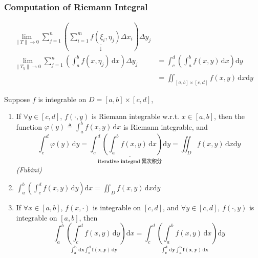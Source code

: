 \subsubsection[二重积分的计算]{Computation of Riemann Integral}

\begin{align*}
    \lim_{\|T\|\to 0}\sum_{j=1}^n\left(\underset{\downarrow}{\underline{\sum_{i=1}^mf(\xi_i,\eta_j)\Delta x_i}}\right)\Delta y_j
     &                                                               \\
    \lim_{\|T_y\|\to 0}\sum_{j=1}^n\left(\int_a^bf(x,\eta_j)\,\mathrm{d}x\right)\Delta y_j
     & =\int_c^d\left(\int_a^b f(x,y)\,\mathrm{d}x\right)\mathrm{d}y \\
     & =\iint_{[a,b]\times[c,d]}f(x,y)\,\mathrm{d}x\mathrm{d}y
\end{align*}

\begin{theorem}
    Suppose $f$ is integrable on $D=[a,b]\times[c,d]$,
    \begin{enumerate}
        \item If $\forall y\in[c,d]$, $f(\cdot,y)$ is Riemann integrable w.r.t. $x\in[a,b]$, then the function $\varphi(y)\triangleq\int_a^bf(x,y)\,\mathrm{d}x$ is Riemann integrable, and
              $$\int_c^d\varphi(y)\,\mathrm{d}y=\underset{\textbf{iterative integral 累次积分}}{\underline{\int_c^d\left(\int_a^b f(x,y)\,\mathrm{d}x\right)\mathrm{d}y}}=\iint_D f(x,y)\,\mathrm{d}x\mathrm{d}y$$\emph{(Fubini)}
        \item $\int_a^b\left(\int_c^df(x,y)\,\mathrm{d}y\right)\mathrm{d}x=\iint_D f(x,y)\,\mathrm{d}x\mathrm{d}y$
        \item If $\forall x\in[a,b]$, $f(x,\cdot)$ is integrable on $[c,d]$, and $\forall y\in[c,d]$, $f(\cdot,y)$ is integrable on $[a,b]$, then
              $$\underset{\textstyle\boldsymbol{\int_a^b\,\mathrm{d}x\int_c^df(x,y)\,\mathrm{d}y}}{\int_a^b\left(\int_c^df(x,y)\,\mathrm{d}y\right)\mathrm{d}x}=\underset{\textstyle\boldsymbol{\int_c^d\,\mathrm{d}y\int_a^bf(x,y)\,\mathrm{d}x}}{\int_c^d\left(\int_a^b f(x,y)\,\mathrm{d}x\right)\mathrm{d}y}$$
    \end{enumerate}
\end{theorem}

